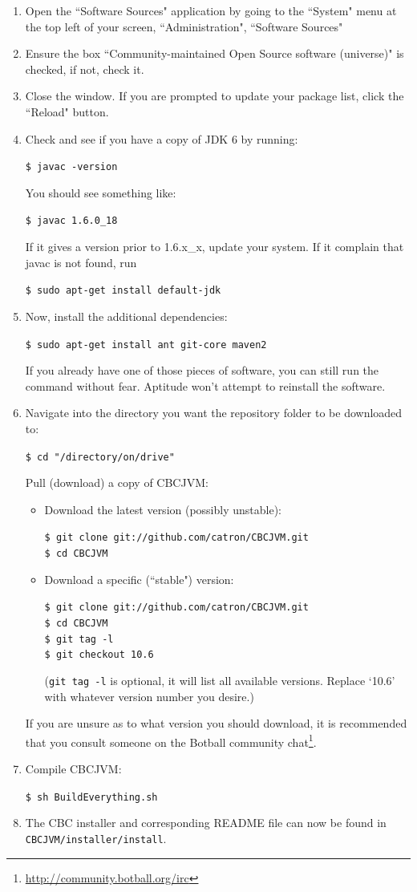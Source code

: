 \documentclass[10pt,letterpaper]{article}
\newcommand{\urlfootnote}[1]{\footnote{\url{#1}}}
\newcommand{\code}[1]{\par\texttt{#1}\par}
\begin{document}
\begin{enumerate}
\item Open the ``Software Sources" application by going to the ``System" menu at the top left of your screen, ``Administration", ``Software Sources"
\item Ensure the box ``Community-maintained Open Source software (universe)" is checked, if not, check it.
\item Close the window. If you are prompted to update your package list, click the ``Reload" button.
\item Check and see if you have a copy of JDK 6 by running:
      \code{\$ javac -version}
      You should see something like:
      \code{\$ javac 1.6.0{\_}18}
      If it gives a version prior to 1.6.x{\_}x, update your system. If it complain that javac is not found, run
      \code{\$ sudo apt-get install default-jdk}
\item Now, install the additional dependencies:
      \code{\$ sudo apt-get install ant git-core maven2}
      If you already have one of those pieces of software, you can still run the command without fear. Aptitude won't attempt to reinstall the software.
\item Navigate into the directory you want the repository folder to be downloaded to:
      \code{\$ cd "/directory/on/drive"}
      Pull (download) a copy of CBCJVM:\par
      \begin{itemize}
          \item Download the latest version (possibly unstable):
                \code{\$ git clone git://github.com/catron/CBCJVM.git \\
                      \$ cd CBCJVM}
          \item Download a specific (``stable") version:
                \code{\$ git clone git://github.com/catron/CBCJVM.git \\
                      \$ cd CBCJVM \\
                      \$ git tag -l \\
                      \$ git checkout 10.6}
                (\texttt{git tag -l} is optional, it will list all available versions. Replace `10.6' with whatever version number you desire.)
      \end{itemize}
      If you are unsure as to what version you should download, it is recommended that you consult someone on the Botball community chat\urlfootnote{http://community.botball.org/irc}.
\item Compile CBCJVM:
      \code{\$ sh BuildEverything.sh}
\item The CBC installer and corresponding README file can now be found in \texttt{CBCJVM/installer/install}.
\end{enumerate}
\end{document}
